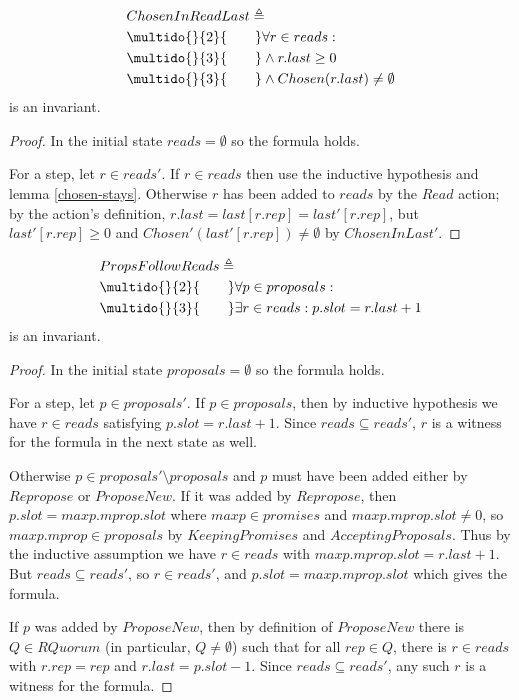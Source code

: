 \documentclass[12pt,a4paper,en]{pracamgr}
\newcommand{\ind}[1]{\multido{}{#1}{\qquad}}
\begin{document}
\begin{lemma}
    \begin{align*}
        & ChosenInReadLast \triangleq\\
        & \ind{2} \forall r \in reads:\\
        & \ind{3} \land r.last \ge 0\\
        & \ind{3} \land Chosen(r.last) \neq \emptyset
    \end{align*}
    is an invariant.
\end{lemma}
\begin{proof}
    In the initial state $reads = \emptyset$ so the formula holds.

    For a step, let $r \in reads'$. If $r \in reads$ then use the inductive hypothesis and lemma \ref{chosen-stays}. Otherwise $r$ has been added to $reads$ by the $Read$ action; by the action's definition, $r.last = last[r.rep] = last'[r.rep]$, but $last'[r.rep] \ge 0$ and $Chosen'(last'[r.rep]) \neq \emptyset$ by $ChosenInLast'$.
\end{proof}

\begin{lemma}
    \begin{align*}
        & PropsFollowReads \triangleq\\
        & \ind{2} \forall p \in proposals:\\
        & \ind{3} \exists r \in reads: p.slot = r.last + 1
    \end{align*}
    is an invariant.
\end{lemma}
\begin{proof}
    In the initial state $proposals = \emptyset$ so the formula holds.

    For a step, let $p \in proposals'$. If $p \in proposals$, then by inductive hypothesis we have $r \in reads$ satisfying $p.slot = r.last + 1$. Since $reads \subseteq reads'$, $r$ is a witness for the formula in the next state as well.

    Otherwise $p \in proposals' \setminus proposals$ and $p$ must have been added either by $Repropose$ or $ProposeNew$. If it was added by $Repropose$, then $p.slot = maxp.mprop.slot$ where $maxp \in promises$ and $maxp.mprop.slot \neq 0$, so $maxp.mprop \in proposals$ by $KeepingPromises$ and $AcceptingProposals$. Thus by the inductive assumption we have $r \in reads$ with $maxp.mprop.slot = r.last + 1$. But $reads \subseteq reads'$, so $r \in reads'$, and $p.slot = maxp.mprop.slot$ which gives the formula.

    If $p$ was added by $ProposeNew$, then by definition of $ProposeNew$ there is $Q \in RQuorum$ (in particular, $Q \neq \emptyset$) such that for all $rep \in Q$, there is $r \in reads$ with $r.rep = rep$ and $r.last = p.slot - 1$. Since $reads \subseteq reads'$, any such $r$ is a witness for the formula.
\end{proof}
\end{document}
